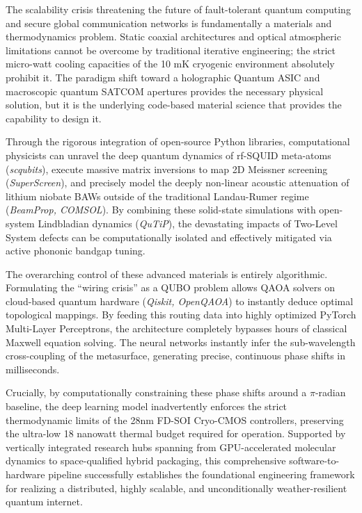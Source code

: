 \documentclass[11pt, a4paper]{article}
\begin{document}
The scalability crisis threatening the future of fault-tolerant quantum computing and secure global communication networks is fundamentally a materials and thermodynamics problem. Static coaxial architectures and optical atmospheric limitations cannot be overcome by traditional iterative engineering; the strict micro-watt cooling capacities of the 10 mK cryogenic environment absolutely prohibit it. The paradigm shift toward a holographic Quantum ASIC and macroscopic quantum SATCOM apertures provides the necessary physical solution, but it is the underlying code-based material science that provides the capability to design it.

Through the rigorous integration of open-source Python libraries, computational physicists can unravel the deep quantum dynamics of rf-SQUID meta-atoms (\textit{scqubits}), execute massive matrix inversions to map 2D Meissner screening (\textit{SuperScreen}), and precisely model the deeply non-linear acoustic attenuation of lithium niobate BAWs outside of the traditional Landau-Rumer regime (\textit{BeamProp, COMSOL}). By combining these solid-state simulations with open-system Lindbladian dynamics (\textit{QuTiP}), the devastating impacts of Two-Level System defects can be computationally isolated and effectively mitigated via active phononic bandgap tuning.

The overarching control of these advanced materials is entirely algorithmic. Formulating the ``wiring crisis'' as a QUBO problem allows QAOA solvers on cloud-based quantum hardware (\textit{Qiskit, OpenQAOA}) to instantly deduce optimal topological mappings. By feeding this routing data into highly optimized PyTorch Multi-Layer Perceptrons, the architecture completely bypasses hours of classical Maxwell equation solving. The neural networks instantly infer the sub-wavelength cross-coupling of the metasurface, generating precise, continuous phase shifts in milliseconds.

Crucially, by computationally constraining these phase shifts around a $\pi$-radian baseline, the deep learning model inadvertently enforces the strict thermodynamic limits of the 28nm FD-SOI Cryo-CMOS controllers, preserving the ultra-low 18 nanowatt thermal budget required for operation. Supported by vertically integrated research hubs spanning from GPU-accelerated molecular dynamics to space-qualified hybrid packaging, this comprehensive software-to-hardware pipeline successfully establishes the foundational engineering framework for realizing a distributed, highly scalable, and unconditionally weather-resilient quantum internet.
\end{document}
